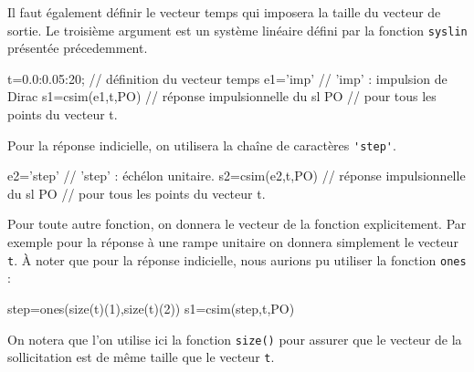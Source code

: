 Il faut également définir le vecteur temps qui imposera la 
taille du vecteur de sortie. Le troisième argument est un système linéaire
défini par la fonction \verb?syslin? présentée précedemment. 
\begin{Scilabcode}
t=0.0:0.05:20;             // définition du vecteur temps 
e1='imp'                   // 'imp' : impulsion de Dirac
s1=csim(e1,t,PO)           // réponse impulsionnelle du sl PO
                           // pour tous les points du vecteur t.
\end{Scilabcode}
Pour la réponse indicielle, on utilisera la chaîne de caractères \verb?'step'?.
\begin{Scilabcode}
e2='step'                  // 'step' : échélon unitaire.
s2=csim(e2,t,PO)           // réponse impulsionnelle du sl PO
                           // pour tous les points du vecteur t.
\end{Scilabcode}
Pour toute autre fonction, on donnera le vecteur de la fonction explicitement. 
Par exemple pour la réponse à une rampe unitaire on donnera simplement 
le vecteur \verb?t?. \`A noter que pour la réponse indicielle, nous aurions 
pu utiliser la fonction \verb?ones? :
\begin{Scilabcode}
step=ones(size(t)(1),size(t)(2))
s1=csim(step,t,PO)
\end{Scilabcode}
On notera que l'on utilise ici la fonction \verb?size()? pour assurer que le 
vecteur de la sollicitation est de même taille que le vecteur \verb?t?. 
